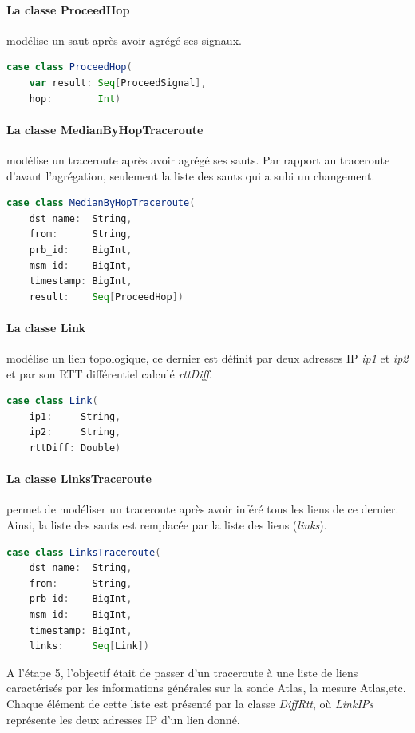 \paragraph{La classe ProceedHop } modélise un saut après avoir agrégé ses signaux. 
\begin{lstlisting}[language=scala]
case class ProceedHop(
	var result: Seq[ProceedSignal],
	hop:        Int)
\end{lstlisting}


\paragraph{La classe MedianByHopTraceroute } modélise un traceroute après avoir agrégé ses sauts. Par rapport au traceroute d'avant l'agrégation, seulement la liste des sauts qui a subi un changement. 
\begin{lstlisting}[language=scala]
case class MedianByHopTraceroute(
	dst_name:  String,
	from:      String,
	prb_id:    BigInt,
	msm_id:    BigInt,
	timestamp: BigInt,
	result:    Seq[ProceedHop])
\end{lstlisting}


\paragraph{La classe Link} modélise un lien topologique, ce dernier est définit par deux adresses IP  \textit{ip1} et \textit{ip2} et par son RTT différentiel calculé \textit{rttDiff}.
\begin{lstlisting}[language=scala]
case class Link(
	ip1:     String,
	ip2:     String,
	rttDiff: Double)
\end{lstlisting}

\paragraph{La classe LinksTraceroute} permet de modéliser un traceroute après avoir inféré tous les liens de ce dernier. Ainsi, la liste des sauts est remplacée par la liste des liens (\textit{links}). 

\begin{lstlisting}[language=scala]
case class LinksTraceroute(
	dst_name:  String,
	from:      String,
	prb_id:    BigInt,
	msm_id:    BigInt,
	timestamp: BigInt,
	links:     Seq[Link])
\end{lstlisting}


A l'étape 5, l'objectif était de passer d'un traceroute à une liste de liens caractérisés par les informations générales sur la sonde Atlas, la mesure Atlas,etc. Chaque élément de cette liste est présenté par la classe \textit{DiffRtt}, où \textit{LinkIPs} représente les deux adresses IP d'un lien donné.
